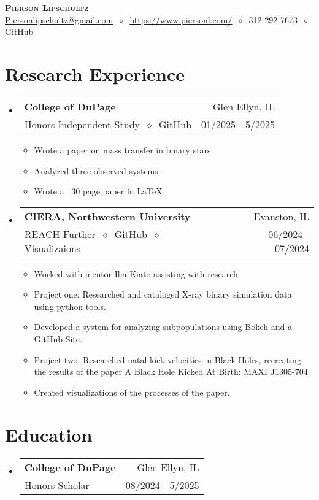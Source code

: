 \documentclass[letterpaper,11pt]{article}
\makeatletter
\newcommand{\cvitem}[1]{
  \item\small{
    {#1\vspace{-2pt}}
  }
}
\newcommand{\cvheading}[4]{
  \vspace{-2pt}\item
    \begin{tabular*}{\textwidth}[t]{l@{\extracolsep{\fill}}r}
      \textbf{#1} & #2 \\
      \small#3 & \small #4 \\
    \end{tabular*}\vspace{-7pt}
}
\newcommand{\cvheadingstart}{\begin{itemize}[leftmargin=0in, label={}]}
\newcommand{\cvheadingend}{\end{itemize}}
\newcommand{\cvitemstart}{\begin{itemize}[label=\textopenbullet]\justifying}
\newcommand{\cvitemend}{\end{itemize}\vspace{-5pt}}
\makeatother
\begin{document}
\begin{center}
  \textbf{\LARGE\scshape Pierson Lipschultz} \\
  \vspace{1pt}\small
  \href{mailto:}{Piersonlipschultz@gmail.com}
  $\ \diamond\ $
  \href{https://www.piersonl.com/}{https://www.piersonl.com/}
  $\ \diamond\ $ 
  312-292-7673
  $\ \diamond\ $
  \href{https://github.com/PiersonLip}{GitHub}
\end{center}

\section{Research Experience}
\cvheadingstart
  \cvheading
    {College of DuPage}{Glen Ellyn, IL}
    {Honors Independent Study $\ \diamond\ $ \href{https://github.com/PiersonLip/Honors-Independent-Study}{GitHub}}{01/2025 - 5/2025}
  \cvitemstart
    \cvitem{Wrote a paper on mass transfer in binary stars}
    \cvitem{Analyzed three observed systems}
    \cvitem{Wrote a ~30 page paper in \LaTeX}
  \cvitemend

  \cvheading
    {CIERA, Northwestern University}{Evanston, IL}
    {REACH Further $\ \diamond\ $ \href{https://piersonlip.github.io/XB/}{GitHub} $\ \diamond\ $ \href{https://youtube.com/playlist?list=PLq73rWo79HTuEUPYdUz11PpY6DLhuF9Wl\&si=VjHikj-V-IePgofn}{Visualizaions}}{06/2024 - 07/2024}

  \cvitemstart
    \cvitem{Worked with mentor Ilia Kiato assisting with research}
    \cvitem{Project one: Researched and cataloged X-ray binary simulation data using python tools.}
    \cvitem{Developed a system for analyzing subpopulations using Bokeh and a GitHub Site.}
    \cvitem{Project two: Researched natal kick velocities in Black Holes, recreating the results of the paper A Black Hole Kicked At Birth: MAXI J1305-704.}
    \cvitem{Created visualizations of the processes of the paper.}
  \cvitemend


\cvheadingend

\section{Education}
\cvheadingstart
  \cvheading
    {College of DuPage}{Glen Ellyn, IL}
    {Honors Scholar}{08/2024 - 5/2025}
\cvheadingend
\end{document}
